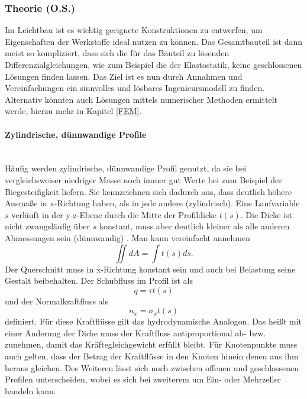 
\subsubsection{Theorie (O.S.)}
Im Leichtbau ist es wichtig geeignete Konstruktionen zu entwerfen, um Eigenschaften der Werkstoffe ideal nutzen zu können. Das Gesamtbauteil ist dann meist so kompliziert, dass sich die für das Bauteil zu lösenden Differenzialgleichungen, wie zum Beispiel die der Elastostatik, keine geschlossenen Lösungen finden lassen. Das Ziel ist es nun durch Annahmen und Vereinfachungen ein sinnvolles und lösbares Ingenieursmodell zu finden. Alternativ könnten auch Lösungen mittels numerischer Methoden ermittelt werde, hierzu mehr in Kapitel \ref{FEM}.

\paragraph{Zylindrische, dünnwandige Profile}~\\
Häufig werden zylindrische, dünnwandige Profil genutzt, da sie bei vergleichsweiser niedriger Masse noch immer gut Werte bei zum Beispiel der Biegesteifigkeit liefern. Sie kennzeichnen sich dadurch aus, dass deutlich höhere Ausmaße in x-Richtung haben, als in jede andere (zylindrisch). Eine Laufvariable $s$ verläuft in der y-z-Ebene durch die Mitte der Profildicke $t(s)$. Die Dicke ist nicht zwangsläufig über $s$ konstant, muss aber deutlich kleiner als alle anderen Abmessungen sein (dünnwandig) \cite{item15}. Man kann vereinfacht annehmen
\begin{equation}
	\iint dA=\int t(s)ds.
\end{equation} 
Der Querschnitt muss in x-Richtung konstant sein und auch bei Belastung seine Gestalt beibehalten. Der Schubfluss im Profil ist als
\begin{equation}\label{tau}
	q=\tau t(s)
\end{equation}
und der Normalkraftfluss als
\begin{equation}
	n_x=\sigma_x t(s)
\end{equation}
definiert. Für diese Kraftflüsse gilt das hydrodynamische Analogon. Das heißt mit einer Änderung der Dicke muss der Kraftfluss antiproportional ab- bzw. zunehmen, damit das Kräftegleichgewicht erfüllt bleibt. Für Knotenpunkte muss auch gelten, dass der Betrag der Kraftflüsse in den Knoten hinein denen aus ihm heraus gleichen. Des Weiteren lässt sich noch zwischen offenen und geschlossenen Profilen unterscheiden, wobei es sich bei zweiterem um Ein- oder Mehrzeller handeln kann.\cite{item15}

